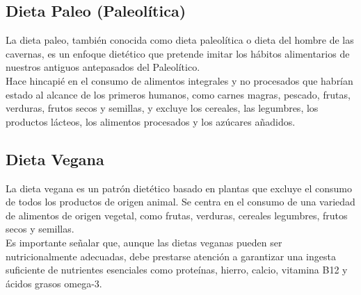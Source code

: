 \documentclass[12pt,a4paper]{article}
\begin{document}
\subsection{Dieta Paleo (Paleolítica)}
\cite{marvastipopular} La dieta paleo, también conocida como dieta 
paleolítica o dieta del hombre de las cavernas, es un enfoque 
dietético que pretende imitar los hábitos alimentarios de nuestros 
antiguos antepasados del Paleolítico. \\

Hace hincapié en el consumo de alimentos integrales y no procesados 
que habrían estado al alcance de los primeros humanos, como carnes magras, 
pescado, frutas, verduras, frutos secos y semillas, y excluye los cereales, 
las legumbres, los productos lácteos, los alimentos procesados y los 
azúcares añadidos.

\subsection{Dieta Vegana}
\cite{marvastipopular} La dieta vegana es un patrón dietético basado en 
plantas que excluye el consumo de todos los productos de origen animal. Se 
centra en el consumo de una variedad de alimentos de origen vegetal, como 
frutas, verduras, cereales legumbres, frutos secos y semillas.\\

Es importante señalar que, aunque las dietas veganas pueden ser 
nutricionalmente adecuadas, debe prestarse atención a garantizar una 
ingesta suficiente de nutrientes esenciales como proteínas, hierro, 
calcio, vitamina B12 y ácidos grasos omega-3.

\newpage

\printbibliography[title={Referencias}]
\end{document}

